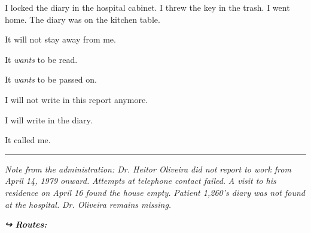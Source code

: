 \noindent I locked the diary in the hospital cabinet.
I threw the key in the trash.
I went home.
The diary was on the kitchen table.

\noindent It will not stay away from me.

\noindent It \textit{wants} to be read.

\noindent It \textit{wants} to be passed on.

\noindent I will not write in this report anymore.

\noindent I will write in the diary.

\noindent It called me.

\vspace{0.5em}\noindent\rule{\textwidth}{0.5pt}\vspace{0.5em}

\noindent \textit{Note from the administration: Dr. Heitor Oliveira did not report to work from April 14, 1979 onward.}
\textit{Attempts at telephone contact failed.}
\textit{A visit to his residence on April 16 found the house empty.}
\textit{Patient 1,260's diary was not found at the hospital.}
\textit{Dr. Oliveira remains missing.}

\vspace{0.5em}
\noindent\textit{\textbf{↪ Routes:}  \rotasep {}}
